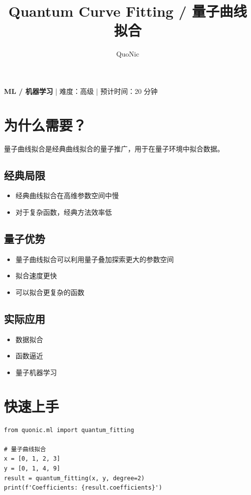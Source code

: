\documentclass[12pt,a4paper]{article}
\title{Quantum Curve Fitting / 量子曲线拟合}
\author{QuoNic}
\date{}
\begin{document}
\maketitle

\begin{center}
\textbf{ML / 机器学习} | 难度：高级 | 预计时间：20 分钟
\end{center}

\tableofcontents
\newpage

\section{为什么需要？}

量子曲线拟合是经典曲线拟合的量子推广，用于在量子环境中拟合数据。

\subsection{经典局限}
\begin{itemize}
  \item 经典曲线拟合在高维参数空间中慢
  \item 对于复杂函数，经典方法效率低
\end{itemize}

\subsection{量子优势}
\begin{itemize}
  \item 量子曲线拟合可以利用量子叠加探索更大的参数空间
  \item 拟合速度更快
  \item 可以拟合更复杂的函数
\end{itemize}

\subsection{实际应用}
\begin{itemize}
  \item 数据拟合
  \item 函数逼近
  \item 量子机器学习
\end{itemize}

\section{快速上手}

\begin{verbatim}
from quonic.ml import quantum_fitting

# 量子曲线拟合
x = [0, 1, 2, 3]
y = [0, 1, 4, 9]
result = quantum_fitting(x, y, degree=2)
print(f'Coefficients: {result.coefficients}')
\end{verbatim}
\end{document}
